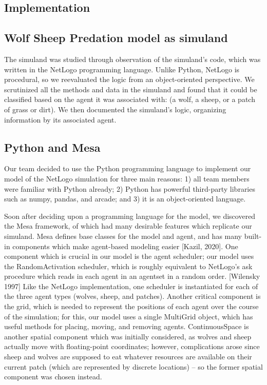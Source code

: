 \begin{multicols}{2}

\section{Implementation}\label{sec:Implementation}

\subsection{Wolf Sheep Predation model as simuland}\label{subsec:simuland-wsp}
    The simuland was studied through observation of the simuland's code,
    which was written in the NetLogo programming language.
    Unlike Python, NetLogo is procedural, so we reevaluated the logic from an
    object-oriented perspective.
    We scrutinized all the methods and data in the simuland and found that it
    could be classified based on the agent it was associated with:
    (a wolf, a sheep, or a patch of grass or dirt).
    We then documented the simuland's logic, organizing information by its
    associated agent.

\subsection{Python and Mesa}\label{subsec:python-and-mesa}
    Our team decided to use the Python programming language to implement our model
    of the NetLogo simulation for three main reasons:
    1) all team members were familiar with Python already;
    2) Python has powerful third-party libraries such as numpy, pandas, and arcade;
    and 3) it is an object-oriented language.

    Soon after deciding upon a programming language for the model,
    we discovered the Mesa framework, of which had many desirable features
    which replicate our simuland.
    Mesa defines base classes for the model and agent,
    and has many built-in components which make agent-based modeling easier [Kazil, 2020].
    One component which is crucial in our model is the agent scheduler;
    our model uses the RandomActivation scheduler, which is roughly equivalent
    to NetLogo's ask procedure which reads in each agent in an
    agentset in a random order. [Wilensky 1997]
    Like the NetLogo implementation, one scheduler is instantiated for each of the
    three agent types (wolves, sheep, and patches).
    Another critical component is the grid, which is needed to represent the positions
    of each agent over the course of the simulation;
    for this, our model uses a single MultiGrid object, which has useful methods
    for placing, moving, and removing agents.
    ContinuousSpace is another spatial component which was initially considered,
    as wolves and sheep actually move with floating-point coordinates;
    however, complications arose since sheep and wolves are supposed to eat whatever
    resources are available on their current patch (which are represented by discrete
    locations) -- so the former spatial component was chosen instead.


\end{multicols}
